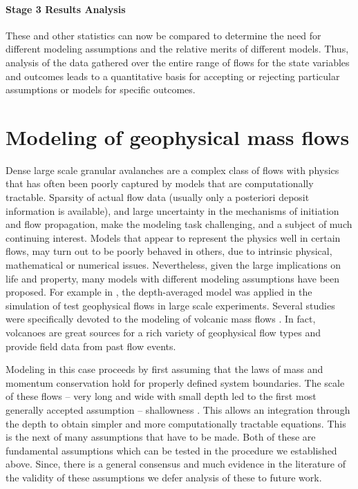 \documentclass{article}
\begin{document}
\paragraph{Stage 3 Results Analysis} These and other statistics can now be compared to determine the need for different modeling assumptions and the relative merits of different models. Thus, analysis of the data gathered over the entire range of flows for the state variables and outcomes leads to a quantitative basis for accepting or rejecting particular assumptions or models for specific outcomes.

\section{Modeling of geophysical mass flows}\label{subsec:FlowTypes}
Dense large scale granular avalanches are a complex class of flows with physics that has often been poorly captured by models that are computationally tractable. Sparsity of actual flow data (usually only a posteriori deposit information is available), and large uncertainty in the mechanisms of initiation and flow propagation, make the modeling task challenging, and a subject of much continuing interest. Models that appear to represent the physics well in certain flows, may turn out to be poorly behaved in others, due to intrinsic physical, mathematical or numerical issues. Nevertheless, given the large implications on life and property, many models with different modeling assumptions have been proposed. For example in \cite{Iverson1997, Iverson2001, Denlinger2001, Pitman2003a, Denlinger2004, Iverson2004}, the depth-averaged model was applied in the simulation of test geophysical flows in large scale experiments. Several studies were specifically devoted to the modeling of volcanic mass flows \citep{Bursik2005,Kelfoun2005,Charbonnier2009,Kelfoun2009,Procter2010,Kelfoun2011,Charbonnier2013}. In fact, volcanoes are great sources for a rich variety of geophysical flow types and provide field data from past flow events.

Modeling in this case proceeds by first assuming that the laws of mass and momentum conservation hold for properly defined system boundaries. The scale of these flows -- very long and wide with small depth led to the first most generally accepted assumption -- shallowness \cite{SavageHutter1989}. This allows an integration through the depth to obtain simpler and more computationally tractable equations. This is the next of many assumptions that have to be made. Both of these are fundamental assumptions which can be tested in the procedure we established above. Since, there is a general consensus and much evidence in the literature of the validity of these assumptions we defer analysis of these to future work.
\end{document}
